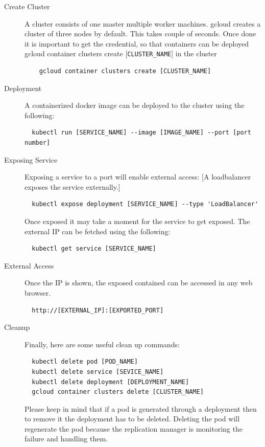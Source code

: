 \begin{description}
\item[Create Cluster] A cluster consists of one master multiple worker 
machines.  gcloud creates a cluster of three nodes by default. This takes
 couple of  seconds. Once done it is important to get the credential, so that
  containers can be deployed gcloud container clusters create
  [\verb|CLUSTER_NAME|] in
   the cluster
  \begin{verbatim}
    gcloud container clusters create [CLUSTER_NAME]
  \end{verbatim}
\item[Deployment] A containerized docker image can be deployed to the cluster 
using the following:
\begin{verbatim}
  kubectl run [SERVICE_NAME] --image [IMAGE_NAME] --port [port number]
\end{verbatim}
\item [Exposing Service] Exposing a service to a port will enable external 
access:
[A loadbalancer exposes the service externally.]
\begin{verbatim}
  kubectl expose deployment [SERVICE_NAME] --type 'LoadBalancer'
\end{verbatim}

Once exposed it may take a moment for the service to get exposed. The
external IP can be fetched using the following:

\begin{verbatim}
  kubectl get service [SERVICE_NAME]
\end{verbatim}

\item [External Access] Once the IP is shown, the exposed contained can be 
accessed in any web browser.
\begin{verbatim}
  http://[EXTERNAL_IP]:[EXPORTED_PORT]
\end{verbatim}

\item [Cleanup] Finally, here are some useful clean up commands:
\begin{verbatim}
  kubectl delete pod [POD_NAME]
  kubectl delete service [SEVICE_NAME]
  kubectl delete deployment [DEPLOYMENT_NAME]
  gcloud container clusters delete [CLUSTER_NAME]
\end{verbatim}

  Please keep in mind that if a pod is generated through a deployment
  then to remove it the deployment has to be deleted. Deleting the pod
  will regenerate the pod because the replication manager is
  monitoring the failure and handling them.

\end{description}

